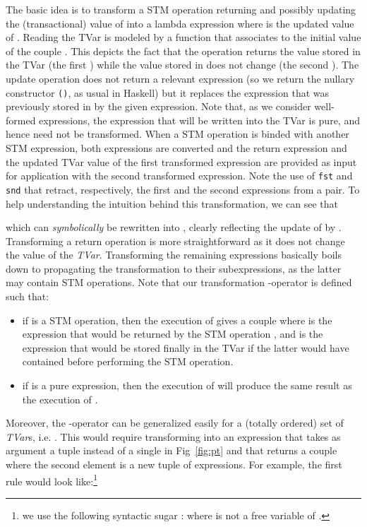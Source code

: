 \documentclass[submission,copyright,creativecommons]{eptcs}
\begin{document}
The basic idea is to transform a STM operation  returning  and possibly updating the (transactional) value of  into a lambda expression  where  is the updated value of . 
Reading the TVar is modeled by a function that associates to the initial value of  the couple . This depicts the fact that the operation returns the value stored in the TVar (the first ) while the value stored in  does not change (the second ). 
The update operation does not return a relevant expression (so we return the nullary constructor \texttt{()}, as usual in Haskell) but it replaces the expression that was previously stored in  by the given expression. 
Note that, as we consider well-formed expressions, the expression  that will be written into the TVar is pure, and hence need not be transformed.
When a STM operation is binded with another STM expression, both expressions are converted and the return expression and the updated TVar value of the first transformed expression are provided as input for application with the second transformed expression. Note the use of \texttt{fst} and \texttt{snd} that retract, respectively, the first and the second expressions from a pair.
To help understanding the intuition behind this transformation, we can see that 
\begin{center}
  
\end{center}
which can  \emph{symbolically} \cite{compiling-haskell-program} be rewritten into , clearly reflecting the update of  by .
Transforming a return operation is more straightforward as it does not change the value of the \emph{TVar}.
Transforming the remaining expressions basically boils down to propagating the transformation to their subexpressions, as the latter may contain STM operations.
Note that our transformation -operator is defined such that:
\begin{itemize}
\item if  is a STM operation, then the execution of  gives a couple  where  is the expression that would be returned by the STM operation , and  is the expression that would be stored finally in the TVar if the latter would have contained  before performing the STM operation.  
\item if  is a pure expression, then the execution of  will produce the same result as the execution of .
\end{itemize}
Moreover, the -operator can be generalized easily for a (totally ordered) set of  \emph{TVar}s, i.e. . This would require transforming into an expression that takes as argument a tuple  instead of a single  in Fig~\ref{fig:pt} and that returns a couple where the second element is a new tuple of  expressions. For example, the first rule would look like:\footnote{we use the following syntactic sugar :  where  is not a free variable of .}
\begin{center}
  
\end{center}
\end{document}
